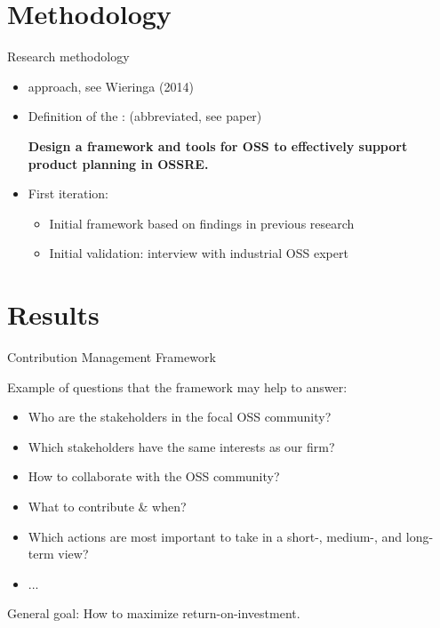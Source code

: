\documentclass{slideclass}
\begin{document}
\section{Methodology}%
\begin{Slide}{Research methodology}
\begin{itemize}
\item {} approach, see Wieringa (2014)
\pause
\item Definition of the : (abbreviated, see paper)
\begin{shaded}
\footnotesize\textbf{Design a framework and tools for OSS  to effectively support product planning in OSSRE.}
\end{shaded}
\pause
\item First iteration:
\begin{itemize}
\item Initial framework based on findings in previous research
\item Initial validation: interview with industrial OSS expert 
\end{itemize}
\end{itemize}
\end{Slide}

\section{Results}

\begin{Slide}{Contribution Management Framework}

\vspace{1em}Example of questions that the framework may help to answer:
\begin{itemize}
\item Who are the stakeholders in the focal OSS community?
\item Which stakeholders have the same interests as our firm?
\item How to collaborate with the OSS community?
\item What to contribute \& when?
\item Which actions are most important to take in a short-, medium-, and long-term view?
\item ...
\end{itemize}
General goal: How to maximize return-on-investment.
\end{Slide}
\end{document}
